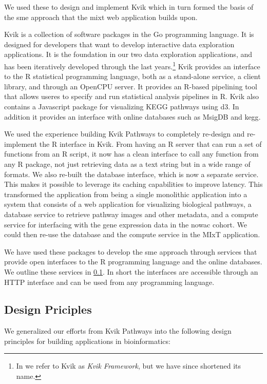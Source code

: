 We used these to design and implement Kvik which in turn formed the basis of  
the \gls{sme} approach that the \gls{mixt} web application builds upon. 

Kvik is a collection of software packages in the Go programming language. It is
designed for developers that want to develop interactive data exploration
applications. It is the foundation in our two data exploration applications, and
has been iteratively developed through the last years.\footnote{In \cite{fjukstad2015kvik} we refer to Kvik as \emph{Kvik Framework}, but we
have since shortened its name.}
Kvik provides an interface to the R statistical programming
language, both as a stand-alone service, a client library, and through an
OpenCPU server. It provides an R-based pipelining tool that allows useres to
specify and run statistical analysis pipelines in R.  Kvik also contains a
Javascript package for visualizing KEGG pathways using d3.\cite{d3}  In addition
it provides an interface with online databases such as MsigDB\cite{msigdb} and
\gls{kegg}\cite{kegg}.

We used the experience building Kvik Pathways to completely re-design and
re-implement the R interface in Kvik. From having an R server that can run a
set of functions from an R script, it now has a clean interface to call any
function from any R package, not just retrieving data as a text string but in a
wide range of formats. We also re-built the database interface, which is now a
separate service. This makes it possible to leverage its caching capabilities
to improve latency. This transformed the application from being a single
monolithic application into a system that consists of a web application for
visualizing biological pathways, a database service to retrieve pathway images
and other metadata, and a compute service for interfacing with the gene
expression data in the \gls{nowac} cohort. We could then re-use the database and the
compute service in the MIxT application. 

We have used these packages to develop the \gls{sme} approach through services
that provide open interfaces to the R programming language and the online
databases.  We outline these services in \ref{micrservices}.  In short the
interfaces are accessible through an HTTP interface and can be used from any
programming language.

\subsection{Design Priciples}\label{micrservices} 
We generalized our efforts from Kvik Pathways into the following design
principles for building applications in bioinformatics: 

